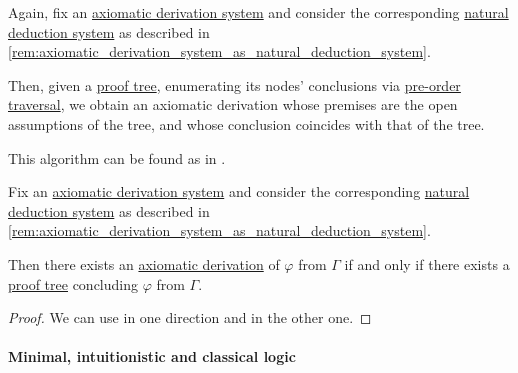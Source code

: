 \begin{algorithm}\label{alg:proof_tree_to_axiomatic_derivation}
  Again, fix an \hyperref[def:axiomatic_derivation_system]{axiomatic derivation system} and consider the corresponding \hyperref[def:abstract_natural_deduction_system]{natural deduction system} as described in \cref{rem:axiomatic_derivation_system_as_natural_deduction_system}.

  Then, given a \hyperref[def:propositional_natural_deduction_proof_tree]{proof tree}, enumerating its nodes' conclusions via \hyperref[def:ordered_tree_enumeration]{pre-order traversal}, we obtain an axiomatic derivation whose premises are the open assumptions of the tree, and whose conclusion coincides with that of the tree.
\end{algorithm}
\begin{comments}
  \item This algorithm can be found as  in \cite{notebook:code}.
\end{comments}

\begin{proposition}\label{thm:axiomatic_derivation_as_natural_deduction}
  Fix an \hyperref[def:axiomatic_derivation_system]{axiomatic derivation system} and consider the corresponding \hyperref[def:abstract_natural_deduction_system]{natural deduction system} as described in \cref{rem:axiomatic_derivation_system_as_natural_deduction_system}.

  Then there exists an \hyperref[def:axiomatic_derivation]{axiomatic derivation} of \( \varphi \) from \( \Gamma \) if and only if there exists a \hyperref[def:propositional_natural_deduction_proof_tree]{proof tree} concluding \( \varphi \) from \( \Gamma \).
\end{proposition}
\begin{proof}
  We can use  in one direction and  in the other one.
\end{proof}

\paragraph{Minimal, intuitionistic and classical logic}

